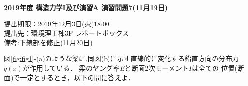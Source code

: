 \documentclass[10pt,a4j]{jarticle}
\newlength{\minitwocolumn}
\begin{document}
\newcommand{\fat}[1]{\mbox{\boldmath $#1$}}
\newcommand{\D}{\partial}
\newcommand{\w}{\omega}
\newcommand{\ga}{\alpha}
\newcommand{\gb}{\beta}
\newcommand{\gx}{\xi}
\newcommand{\gz}{\zeta}
\newcommand{\vhat}[1]{\hat{\fat{#1}}}
\newcommand{\spc}{\vspace{0.7\baselineskip}}
\newcommand{\halfspc}{\vspace{0.3\baselineskip}}

\pagestyle{empty}
\newcommand{\twofig}[2]
 {
   \begin{figure}[here]
     \begin{minipage}[t]{\minitwocolumn}
         \begin{center}   #1
         \end{center}
     \end{minipage}
         \hspace{\columnsep}
     \begin{minipage}[t]{\minitwocolumn}
         \begin{center} #2
         \end{center}
     \end{minipage}
   \end{figure}
 }
\begin{center}
{\Large \bf 2019年度 構造力学I及び演習A 演習問題7(11月19日)} \\
\end{center}
\begin{flushright}
提出期限：2019年12月3日(火)18:00\\
提出先：環境理工棟3F レポートボックス\\
備考:下線部を修正(11月20日)
\end{flushright}
\vspace{15mm}
図\ref{fig:fig1}-(a)のような梁に,同図(b)に示す直線的に変化する鉛直方向の分布力
$q(x)$が作用している． 梁のヤング率$E$と断面2次モーメント$I$は全ての
位置(断面)で一定とするとき，以下の問に答えよ．
\end{document}
